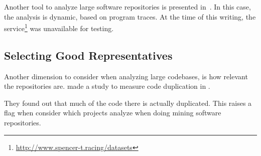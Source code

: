 Another tool to analyze large software repositories is presented in~\cite{brandauer_spencer:_2017}.
In this case, the analysis is dynamic, based on program traces.
At the time of this writing, the service\footnote{\url{http://www.spencer-t.racing/datasets}} was unavailable for testing.


\subsection*{Selecting Good Representatives}

Another dimension to consider when analyzing large codebases, is how relevant the repositories are.
\cite{lopes_dejavu:_2017} made a study to measure code duplication in \github{}.

They found out that much of the code there is actually duplicated.
This raises a flag when consider which projects analyze when doing mining software repositories.








